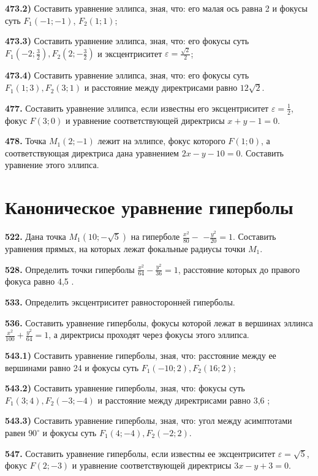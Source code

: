\textbf{473.2)} Составить уравнение эллипса, зная, что: его малая ось равна 2 и фокусы суть $F_1(-1 ;-1)$, $F_2(1 ; 1)$;

\textbf{473.3)} Составить уравнение эллипса, зная, что: его фокусы суть $F_1\left(-2 ; \frac{3}{2}\right), F_2\left(2 ;-\frac{3}{2}\right)$ и эксцентриситет $\varepsilon=\frac{\sqrt{2}}{2}$;

\textbf{473.4)} Составить уравнение эллипса, зная, что: его фокусы суть $F_1(1 ; 3), F_2(3 ; 1)$ и расстояние между директрисами равно $12 \sqrt{2}$.

\textbf{477.} Составить уравнение эллипса, если известны его эксцентриситет $\varepsilon=\frac{1}{2}$, фокус $F(3 ; 0)$ и уравнение соответствующей директрисы $x+y-1=0$.

\textbf{478.} Точка $M_1(2 ;-1)$ лежит на эллипсе, фокус которого $F(1 ; 0)$, а соответствующая директриса дана уравнением $2 x-y-10=0$. Составить уравнение этого эллипса.



\section{Каноническое уравнение гиперболы}



\textbf{522.} Дана точка $M_1(10 ;-\sqrt{5})$ на гиперболе $\frac{x^2}{80}-$ $-\frac{y^2}{20}=1$. Составить уравнения прямых, на которых лежат фокальные радиусы точки $M_1$.

\textbf{528.} Определить точки гиперболы $\frac{x^2}{64}-\frac{y^2}{36}=1$, расстояние которых до правого фокуса равно 4,5 .

\textbf{533.} Определить эксцентриситет равносторонней гиперболы.

\textbf{536.} Составить уравнение гиперболы, фокусы которой лежат в вершинах эллинса $\frac{x^2}{100}+\frac{y^2}{64}=1$, а директрисы проходят через фокусы этого эллипса.

\textbf{543.1)} Составить уравнение гиперболы, зная, что: расстояние между ее вершинами равно 24 и фокусы суть $F_1(-10 ; 2), F_2(16 ; 2)$;

\textbf{543.2)} Составить уравнение гиперболы, зная, что: фокусы суть $F_1(3 ; 4), F_2(-3 ;-4)$ и расстояние между директрисами равно 3,6 ;

\textbf{543.3)} Составить уравнение гиперболы, зная, что: угол между асимптотами равен $90^{\circ}$ и фокусы суть $F_1(4 ;-4), F_2(-2 ; 2)$.

\textbf{547.} Составить уравнение гиперболы, если известны ее эксцентриситет $\varepsilon=\sqrt{5}$, фокус $F(2 ;-3)$ и уравнение соответствующей директрисы $3 x-y+3=0$.

